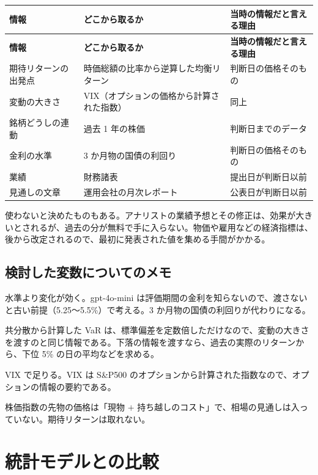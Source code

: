 \documentclass[xelatex,ja=standard,jafont=hiragino-pron,a4paper,10pt]{bxjsreport}
\newcommand{\SP}{S\&P500}
\begin{document}
\begin{longtable}{p{3.80cm}p{4.60cm}p{6.00cm}}
\toprule
\textbf{情報} & \textbf{どこから取るか} & \textbf{当時の情報だと言える理由} \\
\midrule
\endfirsthead
\toprule
\textbf{情報} & \textbf{どこから取るか} & \textbf{当時の情報だと言える理由} \\
\midrule
\endhead
\bottomrule
\endfoot
期待リターンの出発点 & 時価総額の比率から逆算した均衡リターン & 判断日の価格そのもの \\
変動の大きさ & VIX（オプションの価格から計算された指数） & 同上 \\
銘柄どうしの連動 & 過去 1 年の株価 & 判断日までのデータ \\
金利の水準 & 3 か月物の国債の利回り & 判断日の価格そのもの \\
業績 & 財務諸表 & 提出日が判断日以前 \\
見通しの文章 & 運用会社の月次レポート & 公表日が判断日以前 \\
\end{longtable}

使わないと決めたものもある。アナリストの業績予想とその修正は、効果が大きいとされるが、過去の分が無料で手に入らない。物価や雇用などの経済指標は、後から改定されるので、最初に発表された値を集める手間がかかる。

\subsection{検討した変数についてのメモ}

\begin{description}[leftmargin=2em,style=nextline,itemsep=0.4em]
\item[政策金利] 水準より変化が効く。gpt-4o-mini は評価期間の金利を知らないので、渡さないと古い前提（5.25〜5.5\%）で考える。3 か月物の国債の利回りが代わりになる。
\item[下落リスク] 共分散から計算した VaR は、標準偏差を定数倍しただけなので、変動の大きさを渡すのと同じ情報である。下落の情報を渡すなら、過去の実際のリターンから、下位 5\% の日の平均などを求める。
\item[オプションの情報] VIX で足りる。VIX は \SP{} のオプションから計算された指数なので、オプションの情報の要約である。
\item[先物] 株価指数の先物の価格は「現物 $+$ 持ち越しのコスト」で、相場の見通しは入っていない。期待リターンは取れない。
\end{description}

\section{統計モデルとの比較}
\end{document}
